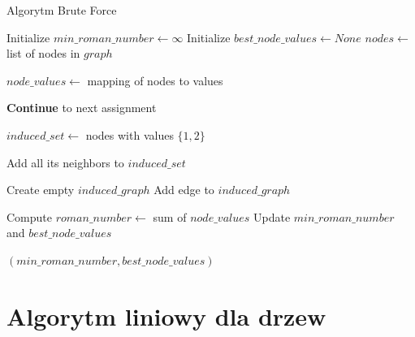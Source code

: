 \begin{algorithm}[H]
    \caption*{Algorytm Brute Force}
    \begin{algorithmic}[1]
            \State Initialize $min\_roman\_number \gets \infty$
            \State Initialize $best\_node\_values \gets None$
            \State $nodes \gets$ list of nodes in $graph$
    
                \State $node\_values \gets$ mapping of nodes to values
                
                 
                            \State \textbf{Continue} to next assignment
                        \EndIf
                    \EndIf
                \EndFor
                
                \State $induced\_set \gets$ nodes with values $\{1,2\}$
    
                    \State Add all its neighbors to $induced\_set$
                \EndFor
    
                \State Create empty $induced\_graph$
                                \State Add edge to $induced\_graph$
                            \EndIf
                        \EndFor
                    \EndIf
                \EndFor
    
                    \State Compute $roman\_number \gets$ sum of $node\_values$
                        \State Update $min\_roman\_number$ and $best\_node\_values$
                    \EndIf
                \EndIf
            \EndFor
    
            \State \Return $(min\_roman\_number, best\_node\_values)$
        \EndFunction
    \end{algorithmic}
\end{algorithm}

\section{Algorytm liniowy dla drzew}

